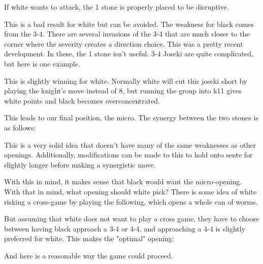 \documentclass[12pt]{IEEEtran}
\begin{document}
If white wants to attack, the 1 stone is properly placed to be disruptive. 
 \cleargoban
{}
\showfullgoban

This is a bad result for white but can be avoided. The weakness for black comes from the 3-4. There are several invasions of the 3-4 that are much closer to the corner where the severity creates a direction choice. This was a pretty recent development. In these, the 1 stone isn't useful. 3-4 Joseki are quite complicated, but here is one example. 

 \cleargoban
{}
\showfullgoban
\par This is slightly winning for white. Normally white will cut this joseki short by playing the knight's move instead of 8, but running the group into k11 gives white points and black becomes overconcentrated. 
\par
This leads to our final position, the micro. The synergy between the two stones is as follows:
 \cleargoban
{}
\showfullgoban

This is a very solid idea that doesn't have many of the same weaknesses as other openings. Additionally, modifications can be made to this to hold onto sente for slightly longer before making a synergistic move. 
 \cleargoban
{}
\showfullgoban
\par
With this in mind, it makes sense that black would want the micro-opening. With that in mind, what opening should white pick? There is some idea of white risking a cross-game by playing the following, which opens a whole can of worms. 
\cleargoban
{}
\showfullgoban
\par But assuming that white does not want to play a cross game, they have to choose between having black approach a 3-4 or 4-4, and approaching a 4-4 is slightly preferred for white. This makes the "optimal" opening: 
\cleargoban
{}
\showfullgoban
\par And here is a reasonable way the game could proceed. 
\showfullgoban
\end{document}
